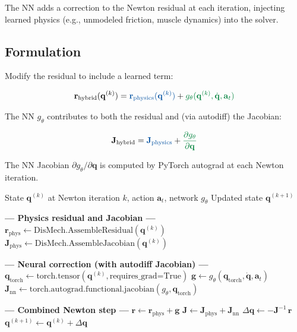 \documentclass[11pt]{article}
\newcommand{\vect}[1]{\mathbf{#1}}
\newcommand{\mat}[1]{\mathbf{#1}}
\newcommand{\phys}[1]{{\color{physicsblue}#1}}
\newcommand{\nn}[1]{{\color{nngreen}#1}}
\begin{document}
The NN adds a correction to the Newton residual at each iteration, injecting learned physics (e.g., unmodeled friction, muscle dynamics) into the solver.

\subsection{Formulation}

Modify the residual to include a learned term:

\begin{equation}
  \vect{r}_{\text{hybrid}}(\vect{q}^{(k)}) = \phys{\vect{r}_{\text{physics}}(\vect{q}^{(k)})} + \nn{g_\theta(\vect{q}^{(k)}, \dot{\vect{q}}, \vect{a}_t)}
  \label{eq:hybrid-residual}
\end{equation}

\noindent
The NN $g_\theta$ contributes to both the residual and (via autodiff) the Jacobian:

\begin{equation}
  \mat{J}_{\text{hybrid}} = \phys{\mat{J}_{\text{physics}}} + \nn{\frac{\partial g_\theta}{\partial \vect{q}}}
  \label{eq:hybrid-jacobian}
\end{equation}

\noindent
The NN Jacobian $\partial g_\theta/\partial \vect{q}$ is computed by PyTorch autograd at each Newton iteration.

\begin{algorithm}[H]
\caption{Gray-Box Newton Step with Residual Correction}
\label{alg:graybox}
\begin{algorithmic}[1]
\Require State $\vect{q}^{(k)}$ at Newton iteration $k$, action $\vect{a}_t$, network $g_\theta$
\Ensure Updated state $\vect{q}^{(k+1)}$

\Statex \textcolor{physicsblue}{\textbf{--- Physics residual and Jacobian ---}}
\State $\vect{r}_{\text{phys}} \gets \text{DisMech.AssembleResidual}(\vect{q}^{(k)})$
\State $\mat{J}_{\text{phys}} \gets \text{DisMech.AssembleJacobian}(\vect{q}^{(k)})$

\Statex
\Statex \textcolor{nngreen}{\textbf{--- Neural correction (with autodiff Jacobian) ---}}
\State $\vect{q}_{\text{torch}} \gets \text{torch.tensor}(\vect{q}^{(k)}, \text{requires\_grad=True})$
\State $\vect{g} \gets g_\theta(\vect{q}_{\text{torch}}, \dot{\vect{q}}, \vect{a}_t)$
\State $\mat{J}_{\text{nn}} \gets \text{torch.autograd.functional.jacobian}(g_\theta, \vect{q}_{\text{torch}})$

\Statex
\Statex \textcolor{hybrid}{\textbf{--- Combined Newton step ---}}
\State $\vect{r} \gets \vect{r}_{\text{phys}} + \vect{g}$
\State $\mat{J} \gets \mat{J}_{\text{phys}} + \mat{J}_{\text{nn}}$
\State $\Delta\vect{q} \gets -\mat{J}^{-1}\,\vect{r}$ 
\State $\vect{q}^{(k+1)} \gets \vect{q}^{(k)} + \Delta\vect{q}$
\end{algorithmic}
\end{algorithm}
\end{document}
